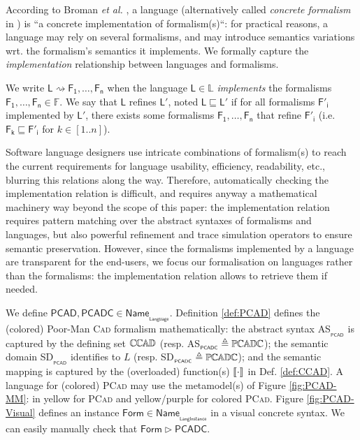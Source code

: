\begin{olddef}
According to Broman \emph{et al.} \cite{Broman-etAl:2012}, a language 
(alternatively called \emph{concrete formalism} in \cite{P:MPM:2006}) is ``a 
concrete implementation of formalism(s)``: 
for practical reasons, a language may rely on several 
formalisms, and may introduce semantics variations wrt. the formalism's 
semantics it implements. We formally capture the \emph{implementation} 
relationship between languages and formalisms.
\begin{Definition}
   
   We write $\mathsf{L} \rightsquigarrow \mathsf{F_1}, \ldots, \mathsf{F_n}$ 
when the language $\mathsf{L}\in\mathbb{L}$ \emph{implements} the formalisms 
$\mathsf{F_1}, \ldots, \mathsf{F_n}\in\mathbb{F}$. We say that $\mathsf{L}$ 
refines $\mathsf{L'}$, noted $\mathsf{L} \sqsubseteq \mathsf{L'}$ if for all 
formalisms $\mathsf{F'_i}$ implemented by $\mathsf{L'}$, there exists some 
formalisms $\mathsf{F_1}, \ldots, \mathsf{F_n}$ that refine $\mathsf{F'_i}$ 
(i.e. $\mathsf{F_k} \sqsubseteq \mathsf{F'_i}$ for $k\in [1..n]$).
\end{Definition}
\noindent
Software language designers use intricate combinations of formalism(s) to reach 
the current requirements for language usability, efficiency, readability, etc., 
blurring this relations along the way. 
Therefore, automatically checking the implementation relation is difficult, and 
requires anyway a mathematical machinery way beyond the scope of this paper: 
the implementation relation requires pattern matching over the abstract 
syntaxes of formalisms and languages, but also powerful refinement and 
trace simulation operators to ensure semantic preservation. 
However, since the formalisms implemented by a language are transparent for the 
end-users, we focus our formalisation on languages rather than the formalisms: 
the implementation relation allows to retrieve them if needed.

\begin{Example}
      We define $\mathsf{PCAD, PCADC} \in 
\mathsf{Name}_{_{\mathsf{Language}}}$. Definition \ref{def:PCAD} defines the 
(colored) Poor-Man \textsc{Cad} formalism mathematically: the abstract syntax 
\textsf{AS}$_{_{\mathsf{PCAD}}}$ is captured by the defining set $\mathbb{C}\mskip-1mu\mathbb{C}\mskip-1mu\mathbb{A}\mskip-1mu\mathbb{D} $ (resp. 
\textsf{AS}$_{_{\mathsf{PCADC}}} \triangleq \mathbb{P}\mskip-1mu\mathbb{C}\mskip-1mu\mathbb{A}\mskip-1mu\mathbb{D}\mskip-1mu\mathbb{C} $); the semantic domain 
\textsf{SD}$_{_{\mathsf{PCAD}}}$ identifies to $L$ (resp. 
\textsf{SD}$_{_{\mathsf{PCADC}}} \triangleq \mathbb{P}\mskip-1mu\mathbb{C}\mskip-1mu\mathbb{A}\mskip-1mu\mathbb{D}\mskip-1mu\mathbb{C} $); and the semantic mapping is 
captured by the (overloaded) function(s) $\llbracket \cdot \rrbracket$ in Def. \ref{def:CCAD}. A 
language for (colored) \textsc{PCad} may use the metamodel(s) of Figure 
\ref{fig:PCAD-MM}: in yellow for \textsc{PCad} and yellow/purple for colored 
\textsc{PCad}. Figure \ref{fig:PCAD-Visual} defines an instance 
$\mathsf{Form}\in\mathsf{Name}_{_{\mathsf{LangInstance}}}$ in a visual concrete 
syntax. We can easily manually check that $\mathsf{Form}\rhd \mathsf{PCADC}$.


\end{Example}
\end{olddef}
